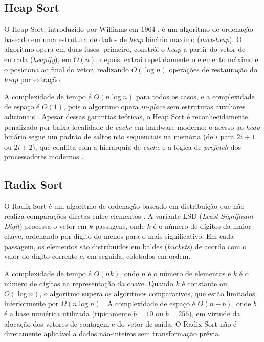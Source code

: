 \documentclass[12pt]{article}
\begin{document}
\subsection{Heap Sort}

O Heap Sort, introduzido por Williams em 1964 \cite{williams1964},
é um algoritmo de ordenação baseado em uma estrutura de dados de
\textit{heap} binário máximo (\textit{max-heap}). O algoritmo
opera em duas fases: primeiro, constrói o \textit{heap} a partir
do vetor de entrada (\textit{heapify}), em $O(n)$; depois,
extrai repetidamente o elemento máximo e o posiciona ao final
do vetor, realizando $O(\log n)$ operações de restauração do
\textit{heap} por extração.

A complexidade de tempo é $O(n \log n)$ para todos os casos, e
a complexidade de espaço é $O(1)$, pois o algoritmo opera
\textit{in-place} sem estruturas auxiliares adicionais
\cite{cormen2009}. Apesar dessas garantias teóricas, o Heap Sort
é reconhecidamente penalizado por baixa localidade de
\textit{cache} em hardware moderno: o acesso ao \textit{heap}
binário segue um padrão de saltos não sequenciais na memória
(de $i$ para $2i+1$ ou $2i+2$), que conflita com a hierarquia
de \textit{cache} e a lógica de \textit{prefetch} dos processadores
modernos \cite{biggar2008}.

\subsection{Radix Sort}

O Radix Sort é um algoritmo de ordenação baseado em distribuição
que não realiza comparações diretas entre elementos \cite{cormen2009}.
A variante LSD (\textit{Least Significant Digit}) processa o vetor
em $k$ passagens, onde $k$ é o número de dígitos da maior chave,
ordenando por dígito do menos para o mais significativo. Em cada
passagem, os elementos são distribuídos em baldes (\textit{buckets})
de acordo com o valor do dígito corrente e, em seguida, coletados
em ordem.

A complexidade de tempo é $O(nk)$, onde $n$ é o número de elementos
e $k$ é o número de dígitos na representação da chave. Quando $k$
é constante ou $O(\log n)$, o algoritmo supera os algoritmos
comparativos, que estão limitados inferiormente por $\Omega(n \log n)$
\cite{knuth1998}. A complexidade de espaço é $O(n + b)$, onde $b$
é a base numérica utilizada (tipicamente $b = 10$ ou $b = 256$),
em virtude da alocação dos vetores de contagem e do vetor de saída.
O Radix Sort não é diretamente aplicável a dados não-inteiros sem
transformação prévia.
\end{document}
